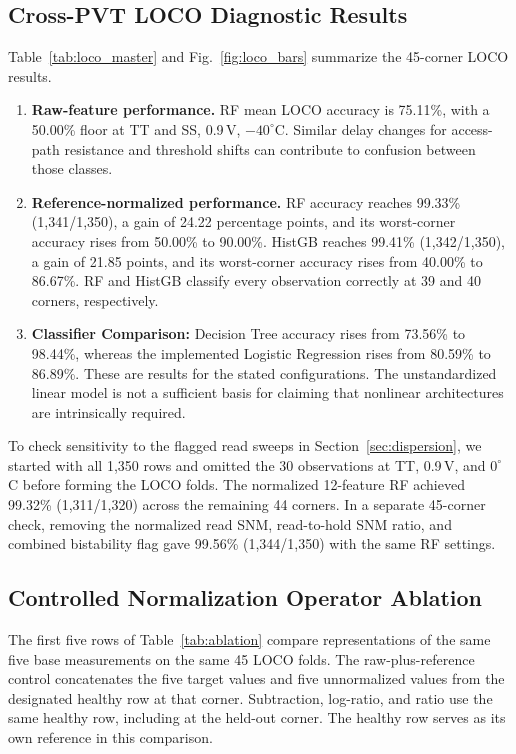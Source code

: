 \documentclass[conference]{IEEEtran}
\begin{document}
\subsection{Cross-PVT LOCO Diagnostic Results}
\label{sec:loco_results}
Table~\ref{tab:loco_master} and Fig.~\ref{fig:loco_bars} summarize the 45-corner LOCO results.

\begin{enumerate}
    \item \textbf{Raw-feature performance.} RF mean LOCO accuracy is 75.11\%, with a 50.00\% floor at TT and SS, 0.9\,V, $-40^\circ$C. Similar delay changes for access-path resistance and threshold shifts can contribute to confusion between those classes.
    \item \textbf{Reference-normalized performance.} RF accuracy reaches 99.33\% (1,341/1,350), a gain of 24.22 percentage points, and its worst-corner accuracy rises from 50.00\% to 90.00\%. HistGB reaches 99.41\% (1,342/1,350), a gain of 21.85 points, and its worst-corner accuracy rises from 40.00\% to 86.67\%. RF and HistGB classify every observation correctly at 39 and 40 corners, respectively.
    \item \textbf{Classifier Comparison:} Decision Tree accuracy rises from 73.56\% to 98.44\%, whereas the implemented Logistic Regression rises from 80.59\% to 86.89\%. These are results for the stated configurations. The unstandardized linear model is not a sufficient basis for claiming that nonlinear architectures are intrinsically required.
\end{enumerate}

To check sensitivity to the flagged read sweeps in Section~\ref{sec:dispersion}, we started with all 1,350 rows and omitted the 30 observations at TT, 0.9\,V, and $0^\circ$C before forming the LOCO folds. The normalized 12-feature RF achieved 99.32\% (1,311/1,320) across the remaining 44 corners. In a separate 45-corner check, removing the normalized read SNM, read-to-hold SNM ratio, and combined bistability flag gave 99.56\% (1,344/1,350) with the same RF settings.

\subsection{Controlled Normalization Operator Ablation}
The first five rows of Table~\ref{tab:ablation} compare representations of the same five base measurements on the same 45 LOCO folds. The raw-plus-reference control concatenates the five target values and five unnormalized values from the designated healthy row at that corner. Subtraction, log-ratio, and ratio use the same healthy row, including at the held-out corner. The healthy row serves as its own reference in this comparison.
\end{document}
